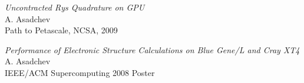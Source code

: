 \documentclass[overlap,line]{cv}
\begin{document}
\begin{resume}

{\it Uncontracted Rys Quadrature on GPU} \\
A. Asadchev \\
Path to Petascale, NCSA, 2009

{\it Performance of Electronic Structure Calculations on Blue Gene/L and Cray XT4} \\
A. Asadchev \\
IEEE/ACM Supercomputing 2008 Poster

\end{resume}
\end{document}
